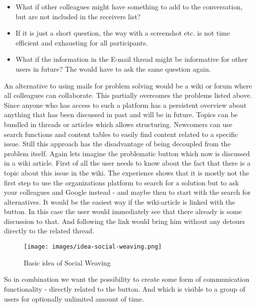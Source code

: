\begin{itemize}
\item What if other colleagues might have something to add to the conversation, but are not included in the receivers list? 

\item If it is just a short question, the way with a screenshot etc. is not time efficient and exhausting for all participants. 

\item What if the information in the E-mail thread might be informative for other users in future? The would have to ask the same question again. 

\end{itemize}

An alternative to using mails for problem solving would be a wiki or forum where all colleagues can collaborate. This partially overcomes the problems listed above. Since anyone who has access to such a platform has a persistent overview about anything that has been discussed in past and will be in future. Topics can be bundled in threads or articles which allows structuring. Newcomers can use search functions and content tables to easily  find content related to a specific issue. 
Still this approach has the disadvantage of being decoupled from the problem itself. Again lets imagine the problematic button which now is discussed in a wiki article. First of all the user needs to know about the fact that there is a topic about this issue in the wiki. The experience shows that it is mostly not the first step to use the organizations platform to search for a solution but to ask your colleagues and Google instead - and maybe then to start with the search for alternatives.  It would be the easiest way if the wiki-article is linked with the button. In this case the user would immediately see that there already is some discussion to that. And following the link would bring him without any detours directly to the related thread.  

\begin{figure}\centering
		\texttt{[image: images/idea-social-weaving.png]}
		\caption{Basic idea of Social Weaving}
		\label{idead-social-weaving}
\end{figure} 


So in combination we want the possibility to create some form of communication functionality - directly related to the button. And which is visible to a group of users for optionally unlimited amount of time.

